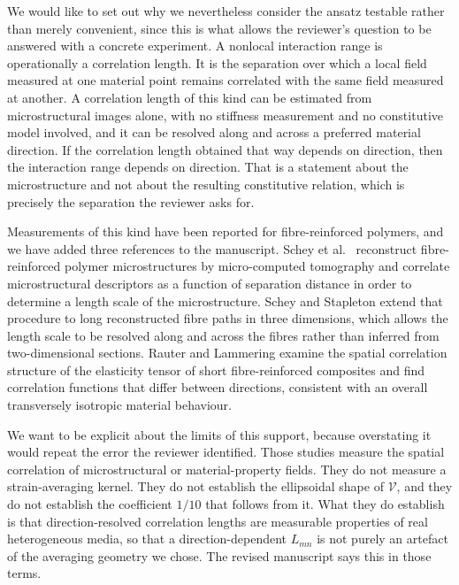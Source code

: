 \documentclass[12pt,a4paper]{article}
\begin{document}
We would like to set out why we nevertheless consider the ansatz testable rather than merely convenient, since this is what allows the reviewer's question to be answered with a concrete experiment. A nonlocal interaction range is operationally a correlation length. It is the separation over which a local field measured at one material point remains correlated with the same field measured at another. A correlation length of this kind can be estimated from microstructural images alone, with no stiffness measurement and no constitutive model involved, and it can be resolved along and across a preferred material direction. If the correlation length obtained that way depends on direction, then the interaction range depends on direction. That is a statement about the microstructure and not about the resulting constitutive relation, which is precisely the separation the reviewer asks for.

Measurements of this kind have been reported for fibre-reinforced polymers, and we have added three references to the manuscript. Schey et al.\ \cite{Schey2019} reconstruct fibre-reinforced polymer microstructures by micro-computed tomography and correlate microstructural descriptors as a function of separation distance in order to determine a length scale of the microstructure. Schey and Stapleton \cite{ScheyStapleton2022} extend that procedure to long reconstructed fibre paths in three dimensions, which allows the length scale to be resolved along and across the fibres rather than inferred from two-dimensional sections. Rauter and Lammering \cite{RauterLammering2020} examine the spatial correlation structure of the elasticity tensor of short fibre-reinforced composites and find correlation functions that differ between directions, consistent with an overall transversely isotropic material behaviour.

We want to be explicit about the limits of this support, because overstating it would repeat the error the reviewer identified. Those studies measure the spatial correlation of microstructural or material-property fields. They do not measure a strain-averaging kernel. They do not establish the ellipsoidal shape of $\mathcal{V}$, and they do not establish the coefficient $1/10$ that follows from it. What they do establish is that direction-resolved correlation lengths are measurable properties of real heterogeneous media, so that a direction-dependent $L_{mn}$ is not purely an artefact of the averaging geometry we chose. The revised manuscript says this in those terms.
\end{document}
